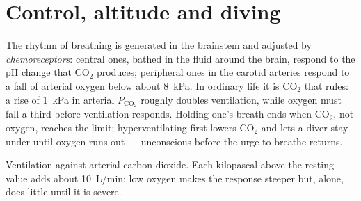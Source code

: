\section{Control, altitude and diving}

\begin{proposition}\label{prop:b1:gas-exchange:control}
The rhythm of breathing is generated in the brainstem and adjusted
by \emph{chemoreceptors}: central ones, bathed in the fluid around the
brain, respond to the pH change that $\mathrm{CO_2}$ produces;
peripheral ones in the carotid arteries respond to a fall of arterial
oxygen below about \qty{8}{kPa}. In ordinary life it is
$\mathrm{CO_2}$ that rules: a rise of \qty{1}{kPa} in arterial
$P_{\mathrm{CO_2}}$ roughly doubles ventilation, while oxygen must fall
a third before ventilation responds. Holding one's breath ends when
$\mathrm{CO_2}$, not oxygen, reaches the limit; hyperventilating first
lowers $\mathrm{CO_2}$ and lets a diver stay under until oxygen runs
out --- unconscious before the urge to breathe returns.
\end{proposition}

\begin{omfigure}

{\small Ventilation against arterial carbon dioxide. Each kilopascal
above the resting value adds about \qty{10}{L/min}; low oxygen makes
the response steeper but, alone, does little until it is severe.}
\end{omfigure}


